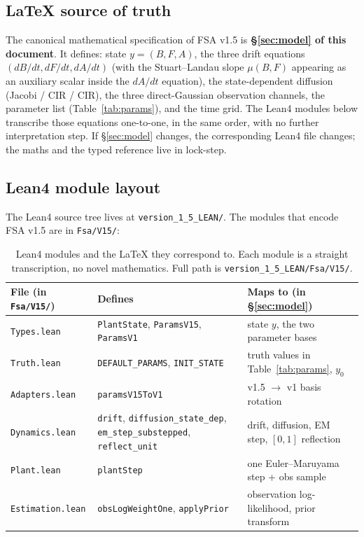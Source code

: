 \documentclass[11pt,a4paper]{article}
\begin{document}
\subsection{LaTeX source of truth}

The canonical mathematical specification of FSA v1.5 is
\textbf{\S\ref{sec:model} of this document}. It defines: state
$y = (B, F, A)$, the three drift equations $(dB/dt, dF/dt, dA/dt)$
(with the Stuart--Landau slope $\mu(B, F)$ appearing as an auxiliary
scalar inside the $dA/dt$ equation), the state-dependent diffusion
(Jacobi / CIR / CIR), the three direct-Gaussian observation channels,
the parameter list (Table~\ref{tab:params}), and the time grid. The Lean4 modules below transcribe those equations one-to-one,
in the same order, with no further interpretation step. If
\S\ref{sec:model} changes, the corresponding Lean4 file changes; the
maths and the typed reference live in lock-step.

\subsection{Lean4 module layout}

The Lean4 source tree lives at
\texttt{version\_1\_5\_LEAN/}. The modules that encode FSA v1.5 are
in \texttt{Fsa/V15/}:

\begin{table}[ht]
\centering
\small
\begin{tabular}{p{30mm}p{65mm}p{50mm}}
\toprule
File (in \texttt{Fsa/V15/}) & Defines & Maps to (in \S\ref{sec:model}) \\
\midrule
\texttt{Types.lean}        & \texttt{PlantState}, \texttt{ParamsV15}, \texttt{ParamsV1} & state $y$, the two parameter bases \\
\texttt{Truth.lean}        & \texttt{DEFAULT\_PARAMS}, \texttt{INIT\_STATE}              & truth values in Table~\ref{tab:params}, $y_0$ \\
\texttt{Adapters.lean}     & \texttt{paramsV15ToV1}                                      & v1.5 $\to$ v1 basis rotation \\
\texttt{Dynamics.lean}     & \texttt{drift}, \texttt{diffusion\_state\_dep}, \texttt{em\_step\_substepped}, \texttt{reflect\_unit} & drift, diffusion, EM step, $[0,1]$ reflection \\
\texttt{Plant.lean}        & \texttt{plantStep}                                          & one Euler--Maruyama step + obs sample \\
\texttt{Estimation.lean}   & \texttt{obsLogWeightOne}, \texttt{applyPrior}               & observation log-likelihood, prior transform \\
\bottomrule
\end{tabular}
\caption{Lean4 modules and the LaTeX they correspond to. Each module
is a straight transcription, no novel mathematics. Full path is
\texttt{version\_1\_5\_LEAN/Fsa/V15/}.}
\label{tab:lean4_modules}
\end{table}
\end{document}
